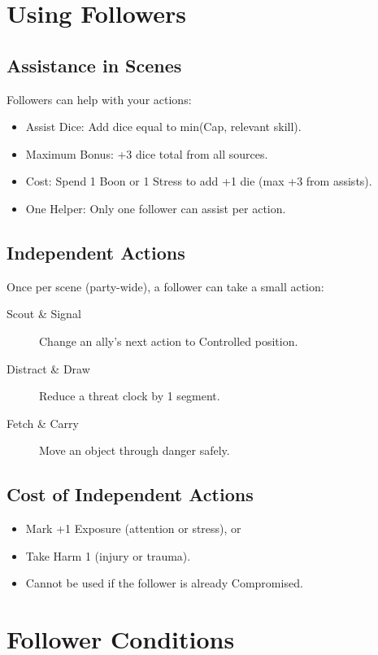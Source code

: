 \documentclass[11pt,twoside,openany]{book}
\begin{document}
\section*{Using Followers} 

\subsection*{Assistance in Scenes}

Followers can help with your actions:
\begin{itemize}
\item Assist Dice: Add dice equal to min(Cap, relevant skill).
\item Maximum Bonus: +3 dice total from all sources.
\item Cost: Spend 1 Boon or 1 Stress to add +1 die (max +3 from assists).
\item One Helper: Only one follower can assist per action.
\end{itemize}

\subsection*{Independent Actions}

Once per scene (party-wide), a follower can take a small action:
\begin{description}
\item[Scout \& Signal] Change an ally's next action to Controlled position.
\item[Distract \& Draw] Reduce a threat clock by 1 segment.
\item[Fetch \& Carry] Move an object through danger safely.
\end{description}

\subsection*{Cost of Independent Actions}

\begin{itemize}
\item Mark +1 Exposure (attention or stress), or
\item Take Harm 1 (injury or trauma).
\item Cannot be used if the follower is already Compromised.
\end{itemize}

\section*{Follower Conditions} 
\end{document}
